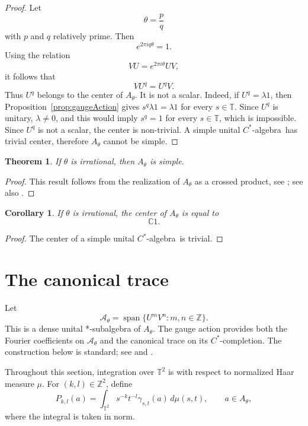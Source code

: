 \documentclass{book}
\newtheorem{theorem}[definition]{Theorem}
\newtheorem{corollary}[definition]{Corollary}
\def\cstar{\(C^*\)-algebra}
\begin{document}
\begin{proof}
Let
\[
\theta=\frac pq
\]
with \(p\) and \(q\) relatively prime. Then
\[
e^{2\pi i q\theta}=1.
\]
Using the relation
\[
VU=e^{2\pi i\theta}UV,
\]
it follows that
\[
VU^q=U^q V.
\]
Thus \(U^q\) belongs to the center of \(A_\theta\). It is not a scalar.
Indeed, if \(U^q=\lambda1\), then Proposition~\ref{prop:gaugeAction} gives
\(s^q\lambda1=\lambda1\) for every \(s\in\mathbb T\). Since \(U^q\) is
unitary, \(\lambda\ne0\), and this would imply \(s^q=1\) for every
\(s\in\mathbb T\), which is impossible. Since \(U^q\) is not
a scalar, the center is non-trivial. A simple unital \cstar\
has trivial center, therefore \(A_\theta\) cannot be simple.
\end{proof}
\begin{theorem}\label{thm:IrrationalTorusSimple}
If \(\theta\) is irrational, then \(A_\theta\) is simple.
\end{theorem}
\begin{proof}
  This result follows from the realization of \(A_\theta\) as a crossed product, see \cite[Theorem~VI.1.4]{Davidson1996};
  see also \cite[p.~415]{Rieffel1981}.
\end{proof}
\begin{corollary}
If \(\theta\) is irrational, the center of \(A_\theta\) is equal to
\[
\mathbb C1.
\]
\end{corollary}

\begin{proof}
The center of a simple unital \cstar\ is trivial.
\end{proof}













\section{The canonical trace}
Let
\[
\mathcal A_\theta
=
\operatorname{span}\{U^mV^n:m,n\in\mathbb Z\}.
\]
This is a dense unital *-subalgebra of \(A_\theta\). The gauge action
provides both the Fourier coefficients on \(\mathcal A_\theta\) and the
canonical trace on its \(C^*\)-completion. The construction below is
standard; see \cite[Chapter~VI, Section~1]{Davidson1996} and
\cite[p.~415]{Rieffel1981}.

Throughout this section, integration over \(\mathbb T^2\) is with respect
to normalized Haar measure \(\mu\). For \((k,l)\in\mathbb Z^2\), define
\[
P_{k,l}(a)
=
\int_{\mathbb T^2}s^{-k}t^{-l}\gamma_{s,t}(a)\,d\mu(s,t),
\qquad a\in A_\theta,
\]
where the integral is taken in norm.
\end{document}
